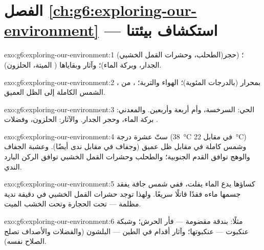 \section*{الفصل \ref{ch:g6:exploring-our-environment} --- استكشاف بيئتنا}

\begin{solution}{exo:g6:exploring-our-environment:1}
 (الطحلب، وحشرات القمل الخشبي)؛ 
(حجر الجدار، وبركة الماء)؛ وآثار  وبقاياها (
الميتة،  الحلزون).
\end{solution}

\begin{solution}{exo:g6:exploring-our-environment:2}
، بمحرار (بالدرجات المئوية)؛  الهواء والتربة؛
، من الشمس الكاملة إلى الظل العميق.
\end{solution}

\begin{solution}{exo:g6:exploring-our-environment:3}
الحي: السرخسة، وأم أربعة وأربعين. والمعدني: بركة الماء، وحجر
الجدار. والآثار:  الحلزون، وفضلات .
\end{solution}

\begin{solution}{exo:g6:exploring-our-environment:4}
ستّ عشرة درجة (\qty{38}{\degreeCelsius} في مقابل
\qty{22}{\degreeCelsius}) وشمس كاملة في مقابل ظل عميق (وجفاف في
مقابل ندى أيضًا). وعشبة الجفاف والوهج توافق القدم الجنوبية؛
والطحلب  وحشرات القمل الخشبي توافق الركن البارد الندي.
\end{solution}

\begin{solution}{exo:g6:exploring-our-environment:5}
كساؤها يدع الماء يفلت، ففي شمس جافة يفقد جسمها ماءه فقدًا قاتلًا
سريعًا. ولهذا توجد حشرات القمل الخشبي في  دقيقة ندية مظلمة ---
تحت الحجارة وتحت الخشب الميت.
\end{solution}

\begin{solution}{exo:g6:exploring-our-environment:6}
مثلًا: بندقة مقضومة --- فأر الحرش؛ وشبكة عنكبوت --- عنكبوتها؛
وآثار أقدام في الطين --- البلشون (والفضلات  والأصداف تصلح
الصلاح نفسه).
\end{solution}

